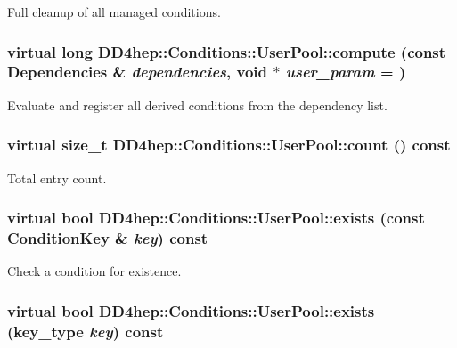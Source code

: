 Full cleanup of all managed conditions. \hypertarget{class_d_d4hep_1_1_conditions_1_1_user_pool_a117faa4219d68ba50835ac691b538b08}{
\subsubsection[{compute}]{\setlength{\rightskip}{0pt plus 5cm}virtual long DD4hep::Conditions::UserPool::compute (const {\bf Dependencies} \& {\em dependencies}, \/  void $\ast$ {\em user\_\-param} = {})}}
\label{class_d_d4hep_1_1_conditions_1_1_user_pool_a117faa4219d68ba50835ac691b538b08}


Evaluate and register all derived conditions from the dependency list. \hypertarget{class_d_d4hep_1_1_conditions_1_1_user_pool_ac5f4c186c5037f379e3c12e2daa21a5e}{
\subsubsection[{count}]{\setlength{\rightskip}{0pt plus 5cm}virtual size\_\-t DD4hep::Conditions::UserPool::count () const}}
\label{class_d_d4hep_1_1_conditions_1_1_user_pool_ac5f4c186c5037f379e3c12e2daa21a5e}


Total entry count. \hypertarget{class_d_d4hep_1_1_conditions_1_1_user_pool_af61d57de60db641dc8db117e2a03d3d7}{
\subsubsection[{exists}]{\setlength{\rightskip}{0pt plus 5cm}virtual bool DD4hep::Conditions::UserPool::exists (const {\bf ConditionKey} \& {\em key}) const}}
\label{class_d_d4hep_1_1_conditions_1_1_user_pool_af61d57de60db641dc8db117e2a03d3d7}


Check a condition for existence. \hypertarget{class_d_d4hep_1_1_conditions_1_1_user_pool_abe05e40f8f674ff18a525b27012aa8d4}{
\subsubsection[{exists}]{\setlength{\rightskip}{0pt plus 5cm}virtual bool DD4hep::Conditions::UserPool::exists ({\bf key\_\-type} {\em key}) const}}
\label{class_d_d4hep_1_1_conditions_1_1_user_pool_abe05e40f8f674ff18a525b27012aa8d4}


